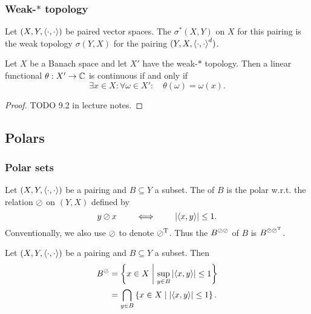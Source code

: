 \subsubsection{Weak-$*$ topology}
\begin{definition}
Let $(X,Y,\left\langle \cdot,\cdot \right\rangle)$ be paired vector spaces. The  $\sigma^*(X,Y)$ on $X$ for this pairing is the weak topology $\sigma(Y,X)$ for the pairing $(Y,X,\left\langle \cdot,\cdot \right\rangle^d)$.
\end{definition}

\begin{proposition} \label{weak*continuousFunctional}
Let $X$ be a Banach space and let $X'$ have the weak-$*$ topology. Then a linear functional $\theta: X'\to \mathbb{C}$ is continuous \textup{if and only if}
\[ \exists x\in X: \forall \omega\in X': \quad \theta(\omega) = \omega(x). \]
\end{proposition}
\begin{proof}
TODO 9.2 in lecture notes.
\end{proof}

\subsection{Polars}
\subsubsection{Polar sets}
\begin{definition}
Let $\left( X,Y,\left\langle \cdot,\cdot \right\rangle \right)$ be a pairing and $B\subseteq Y$ a subset. The  of $B$ is the polar w.r.t. the relation $\oslash$ on $(Y,X)$ defined by
\[ y\oslash x \qquad\iff\qquad \left|\left\langle x, y \right\rangle\right| \leq 1. \]
Conventionally, we also use $\oslash$ to denote $\oslash^{\mathrm{T}}$. Thus the  $B^{\oslash\oslash}$ of $B$ is $B^{\oslash\oslash^{\mathrm{T}}}$.
\end{definition}

\begin{lemma}
Let $\left( X,Y,\left\langle \cdot,\cdot \right\rangle \right)$ be a pairing and $B\subseteq Y$ a subset. Then
\begin{align*}
B^{\oslash} &= \left\{ x\in X \;\middle|\; \sup_{y\in B}\left|\left\langle x,y \right\rangle\right| \leq 1 \right\} \\
&= \bigcap_{y\in B}\left\{ x\in X \;\middle|\; \left|\left\langle x,y \right\rangle\right|\leq 1 \right\}.
\end{align*}
\end{lemma}

